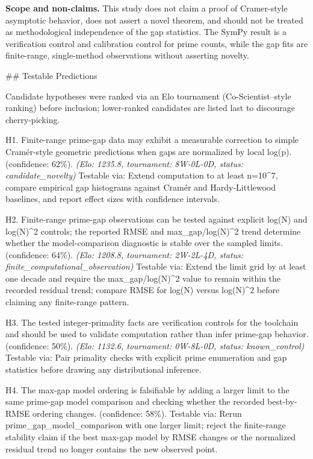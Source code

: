 \documentclass[11pt,a4paper]{article}
\begin{document}
\textbf{Scope and non-claims.} This study does not claim a proof of Cramer-style asymptotic behavior, does not assert a novel theorem, and should not be treated as methodological independence of the gap statistics. The SymPy result is a verification control and calibration control for prime counts, while the gap fits are finite-range, single-method observations without asserting novelty.

\#\# Testable Predictions

Candidate hypotheses were ranked via an Elo tournament (Co-Scientist–style ranking) before inclusion; lower-ranked candidates are listed last to discourage cherry-picking.

H1. Finite-range prime-gap data may exhibit a measurable correction to simple Cramér-style geometric predictions when gaps are normalized by local log(p). (confidence: 62\%). \textit{(Elo: 1235.8, tournament: 8W-0L-0D, status: candidate\_novelty)} Testable via: Extend computation to at least n=10\textasciicircum{}7, compare empirical gap histograms against Cramér and Hardy-Littlewood baselines, and report effect sizes with confidence intervals.

H2. Finite-range prime-gap observations can be tested against explicit log(N) and log(N)\textasciicircum{}2 controls; the reported RMSE and max\_gap/log(N)\textasciicircum{}2 trend determine whether the model-comparison diagnostic is stable over the sampled limits. (confidence: 64\%). \textit{(Elo: 1208.8, tournament: 2W-2L-4D, status: finite\_computational\_observation)} Testable via: Extend the limit grid by at least one decade and require the max\_gap/log(N)\textasciicircum{}2 value to remain within the recorded residual trend; compare RMSE for log(N) versus log(N)\textasciicircum{}2 before claiming any finite-range pattern.

H3. The tested integer-primality facts are verification controls for the toolchain and should be used to validate computation rather than infer prime-gap behavior. (confidence: 50\%). \textit{(Elo: 1132.6, tournament: 0W-8L-0D, status: known\_control)} Testable via: Pair primality checks with explicit prime enumeration and gap statistics before drawing any distributional inference.

H4. The max-gap model ordering is falsifiable by adding a larger limit to the same prime-gap model comparison and checking whether the recorded best-by-RMSE ordering changes. (confidence: 58\%). Testable via: Rerun prime\_gap\_model\_comparison with one larger limit; reject the finite-range stability claim if the best max-gap model by RMSE changes or the normalized residual trend no longer contains the new observed point.
\end{document}

